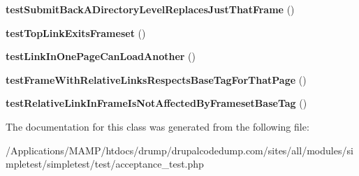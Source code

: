 \begin{DoxyCompactItemize}
\item 
\hypertarget{class_test_of_loading_frames_a104ab22eb46ed7fa996a9faca7facde0}{
{\bfseries testSubmitBackADirectoryLevelReplacesJustThatFrame} ()}
\label{class_test_of_loading_frames_a104ab22eb46ed7fa996a9faca7facde0}

\item 
\hypertarget{class_test_of_loading_frames_a800da88e4919d6799c7765c914cc1a66}{
{\bfseries testTopLinkExitsFrameset} ()}
\label{class_test_of_loading_frames_a800da88e4919d6799c7765c914cc1a66}

\item 
\hypertarget{class_test_of_loading_frames_a5d86a419ee501d2cd82d446c1e4281bf}{
{\bfseries testLinkInOnePageCanLoadAnother} ()}
\label{class_test_of_loading_frames_a5d86a419ee501d2cd82d446c1e4281bf}

\item 
\hypertarget{class_test_of_loading_frames_af79c7c0cfd7bbda4dd36cd3df3049b83}{
{\bfseries testFrameWithRelativeLinksRespectsBaseTagForThatPage} ()}
\label{class_test_of_loading_frames_af79c7c0cfd7bbda4dd36cd3df3049b83}

\item 
\hypertarget{class_test_of_loading_frames_aad7a6754b38873fc0a69f5999e20ee9b}{
{\bfseries testRelativeLinkInFrameIsNotAffectedByFramesetBaseTag} ()}
\label{class_test_of_loading_frames_aad7a6754b38873fc0a69f5999e20ee9b}

\end{DoxyCompactItemize}


The documentation for this class was generated from the following file:\begin{DoxyCompactItemize}
\item 
/Applications/MAMP/htdocs/drump/drupalcodedump.com/sites/all/modules/simpletest/simpletest/test/acceptance\_\-test.php\end{DoxyCompactItemize}
